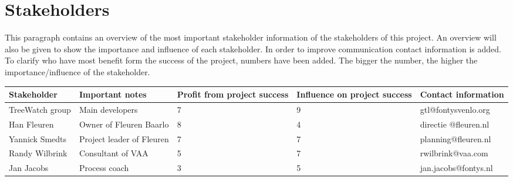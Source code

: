 \section{Stakeholders}

This paragraph contains an overview of the most important stakeholder information of the stakeholders of this project. An overview will also be given to show the importance and influence of each stakeholder. In order to improve communication contact information is added. To clarify who have most benefit form the success of the project, numbers have been added. The bigger the number, the higher the importance/influence of the stakeholder.

\begin{tabular}{| p{} | p{3cm} | p{} | p{} | p{} |}
	\hline
	Stakeholder & Important notes & Profit from project success & Influence on project success & Contact information \\
	\hline
	TreeWatch group & Main developers & 7 & 9 & gtl@fontysvenlo.org \\
	\hline
	Han Fleuren & Owner of Fleuren Baarlo & 8 & 4 & directie @fleuren.nl \\
	\hline
	Yannick Smedts & Project leader of Fleuren & 7 & 7 & planning@fleuren.nl \\
	\hline
	Randy Wilbrink & Consultant of VAA & 5 & 7 & rwilbrink@vaa.com \\
	\hline
	Jan Jacobs & Process coach & 3 & 5 & jan.jacobs@fontys.nl \\
	\hline
\end{tabular}